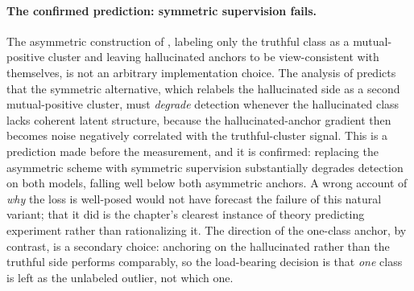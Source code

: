 \paragraph{The confirmed prediction: symmetric supervision fails.}
The asymmetric construction of , labeling only the
truthful class as a mutual-positive cluster and leaving hallucinated anchors to be
view-consistent with themselves, is not an arbitrary implementation choice. The
analysis of  predicts that the symmetric alternative, which
relabels the hallucinated side as a second mutual-positive cluster, must
\emph{degrade} detection whenever the hallucinated class lacks coherent latent
structure, because the hallucinated-anchor gradient then becomes noise negatively
correlated with the truthful-cluster signal. This is a prediction made before the
measurement, and it is confirmed: replacing the asymmetric scheme with symmetric
supervision substantially degrades detection on both models, falling well below
both asymmetric anchors. A wrong account of \emph{why} the loss is well-posed
would not have forecast the failure of this natural variant; that it did is the
chapter's clearest instance of theory predicting experiment rather than
rationalizing it. The direction of the one-class
anchor, by contrast, is a secondary choice: anchoring on the hallucinated rather
than the truthful side performs comparably, so the load-bearing decision is that
\emph{one} class is left as the unlabeled outlier, not which one.

